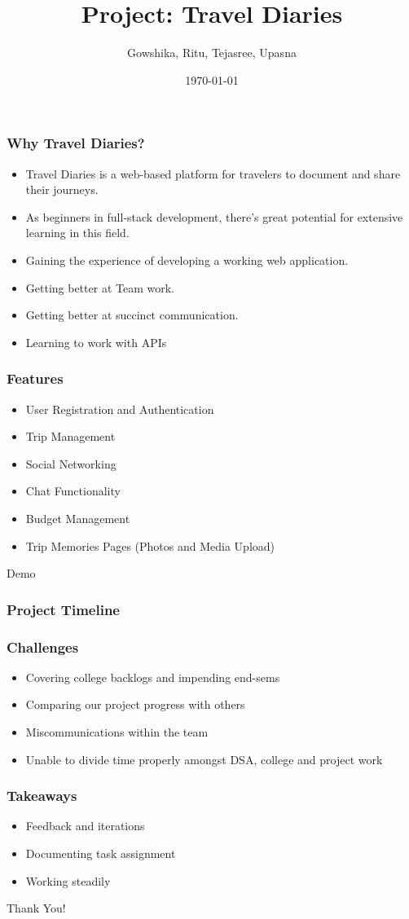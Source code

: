\documentclass{beamer}
\title{Project: Travel Diaries}
\author{Gowshika, Ritu, Tejasree, Upasna}
\date{\today}
\begin{document}
\frame{\titlepage}

\begin{frame}
    \frametitle{Why Travel Diaries?}
    \begin{itemize}
        \item Travel Diaries is a web-based platform for travelers to document and share their journeys.
        \item As beginners in full-stack development, there's great potential for extensive learning in this field.
        \item Gaining the experience of developing a working web application.
        \item Getting better at Team work.
        \item Getting better at succinct communication.
        \item Learning to work with APIs
  \end{itemize}
\end{frame}

\begin{frame}
  \frametitle{Features}
  \begin{itemize}
    \item User Registration and Authentication
    \item Trip Management
    \item Social Networking
    \item Chat Functionality
    \item Budget Management
    \item Trip Memories Pages (Photos and Media Upload)
  \end{itemize}
\end{frame}

\begin{frame}
    \center\Huge Demo
\end{frame}

\begin{frame}
\frametitle{Project Timeline}
\end{frame}

\begin{frame}
  \frametitle{Challenges}
  \begin{itemize}
    \item Covering college backlogs and impending end-sems
    \item Comparing our project progress with others
    \item Miscommunications within the team
    \item Unable to divide time properly amongst DSA, college and project work
  \end{itemize}
  \end{frame}

\begin{frame}
\frametitle{Takeaways}
\begin{itemize}
  \item Feedback and iterations
  \item Documenting task assignment
  \item Working steadily
\end{itemize}
\end{frame}

\begin{frame}
  \center\Huge Thank You!
\end{frame}
\end{document}
